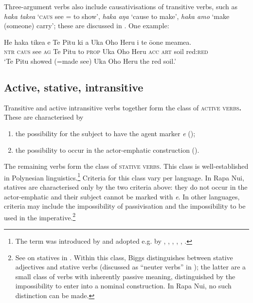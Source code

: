Three-argument verbs also include causativisations of transitive verbs, such as \textit{haka take{\ꞌ}a} ‘\textsc{caus} see = to show’, \textit{haka aŋa} ‘cause to make’, \textit{haka {\ꞌ}amo} ‘make (someone) carry’; these are discussed in . One example:

\ea\label{ex:3.89}
\gll He haka tike{\ꞌ}a e Te Pitu ki a Uka Oho Heru i te {\ꞌ}ō{\ꞌ}one meamea.\\
\textsc{ntr} \textsc{caus} see \textsc{ag} Te Pitu to \textsc{prop} Uka Oho Heru \textsc{acc} \textsc{art} soil red:\textsc{red}\\

\glt 
‘Te Pitu showed (=made see) Uka Oho Heru the red soil.’ \textstyleExampleref{[Fel-1978.070]}
\z

\subsection{Active, stative, intransitive}\label{sec:3.4.2}
Transitive and active intransitive verbs together form the class of \textsc{active verbs}\textbf{.} These are characterised by

\begin{enumerate}
\item 
the possibility for the subject to have the agent marker \textit{e} ();

\item 
the possibility to occur in the actor-emphatic construction ().

\end{enumerate}

The remaining verbs form the class of \textsc{stative verbs}. This class is well-established in Polynesian linguistics.\footnote{\label{fn:117}The term was introduced by \citet{Buse1965} and adopted e.g. by \citet{Hohepa1969Not}, \citet{Biggs1973}, \citet{ElbertPukui1979}, \citet{Chung1978}, \citet{Seiter1980}, \citet{MoselHovdhaugen1992}.} Criteria for this class vary per language. In Rapa Nui, statives are characterised only by the two criteria above: they do not occur in the actor-emphatic and their subject cannot be marked with \textit{e}. In other languages, criteria may include the impossibility of passivisation and the impossibility to be used in the imperative.\footnote{\label{fn:118}See \citet{Biggs1973,Biggs1974} on statives in . Within this class, Biggs distinguishes between stative adjectives and stative verbs (discussed as “neuter verbs” in \citealt{Hooper1984Neuter}); the latter are a small class of verbs with inherently passive meaning, distinguished by the impossibility to enter into a nominal construction. In Rapa Nui, no such distinction can be made.}  

